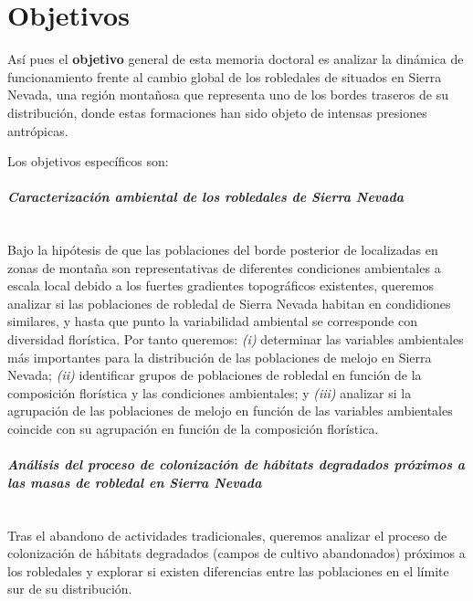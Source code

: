\section{Objetivos}\label{sec:intro:objetivos}
Así pues el \textbf{objetivo} general de esta memoria doctoral es analizar la dinámica de funcionamiento frente al cambio global de los robledales de \Qp situados en Sierra Nevada, una región montañosa que representa uno de los bordes traseros de su distribución, donde estas formaciones han sido objeto de intensas presiones antrópicas. 

Los objetivos específicos son: 

\paragraph{\emph{Caracterización ambiental de los robledales de Sierra Nevada}}\mbox{} \\
Bajo la hipótesis de que las poblaciones del borde posterior de \Qp localizadas en zonas de montaña son representativas de diferentes condiciones ambientales a escala local debido a los fuertes gradientes topográficos existentes, queremos analizar si las poblaciones de robledal de Sierra Nevada habitan en condidiones similares, y hasta que punto la variabilidad ambiental se corresponde con diversidad florística. Por tanto queremos: \emph{(i)} determinar las variables ambientales más importantes para la distribución de las poblaciones de melojo en Sierra Nevada; \emph{(ii)} identificar grupos de poblaciones de robledal en función de la composición florística y las condiciones ambientales; y \emph{(iii)} analizar si la agrupación de las poblaciones de melojo en función de las variables ambientales coincide con su agrupación en función de la composición florística.

\paragraph{\emph{Análisis del proceso de colonización de hábitats degradados próximos a las masas de robledal en Sierra Nevada}}\mbox{} \\
Tras el abandono de actividades tradicionales, queremos analizar el proceso de colonización de hábitats degradados (campos de cultivo abandonados) próximos a los robledales y explorar si existen diferencias entre las poblaciones en el límite sur de su distribución. 

